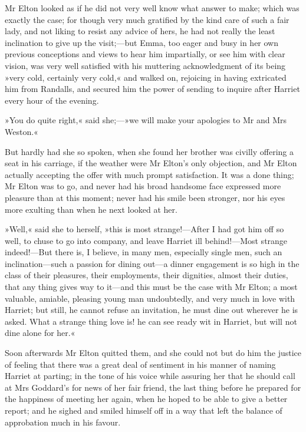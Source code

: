 Mr Elton looked as if he did not very well know what answer to make; which was exactly the case; for though very much gratified by the kind care of such a fair lady, and not liking to resist any advice of hers, he had not really the least inclination to give up the visit;—but Emma, too eager and busy in her own previous conceptions and views to hear him impartially, or see him with clear vision, was very well satisfied with his muttering acknowledgment of its being »very cold, certainly very cold,« and walked on, rejoicing in having extricated him from Randalls, and secured him the power of sending to inquire after Harriet every hour of the evening.

»You do quite right,« said she;—»we will make your apologies to Mr and Mrs Weston.«

But hardly had she so spoken, when she found her brother was civilly offering a seat in his carriage, if the weather were Mr Elton's only objection, and Mr Elton actually accepting the offer with much prompt satisfaction. It was a done thing; Mr Elton was to go, and never had his broad handsome face expressed more pleasure than at this moment; never had his smile been stronger, nor his eyes more exulting than when he next looked at her.

»Well,« said she to herself, »this is most strange!—After I had got him off so well, to chuse to go into company, and leave Harriet ill behind!—Most strange indeed!—But there is, I believe, in many men, especially single men, such an inclination—such a passion for dining out—a dinner engagement is so high in the class of their pleasures, their employments, their dignities, almost their duties, that any thing gives way to it—and this must be the case with Mr Elton; a most valuable, amiable, pleasing young man undoubtedly, and very much in love with Harriet; but still, he cannot refuse an invitation, he must dine out wherever he is asked. What a strange thing love is! he can see ready wit in Harriet, but will not dine alone for her.«

Soon afterwards Mr Elton quitted them, and she could not but do him the justice of feeling that there was a great deal of sentiment in his manner of naming Harriet at parting; in the tone of his voice while assuring her that he should call at Mrs Goddard's for news of her fair friend, the last thing before he prepared for the happiness of meeting her again, when he hoped to be able to give a better report; and he sighed and smiled himself off in a way that left the balance of approbation much in his favour.

